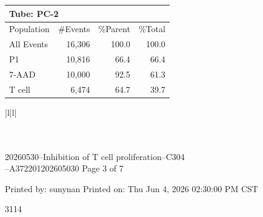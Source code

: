 \documentclass[UTF8,10pt,a4paper,fontset=fandol]{ctexart}
\newcommand{\handwritten}[1]{#1}
\begin{document}
\begin{center}
\begin{tabular}{|l|r|r|r|}
\hline
\multicolumn{4}{|l|}{Tube: PC-2}\\
\hline
Population & \#Events & \%Parent & \%Total\\
\hline
All Events & 16,306 & 100.0 & 100.0\\
P1 & 10,816 & 66.4 & 66.4\\
7-AAD & 10,000 & 92.5 & 61.3\\
T cell & 6,474 & 64.7 & 39.7\\
\hline
\end{tabular}
\end{center}

\vspace{8pt}

\begin{center}
\begin{tabular}{|l|l|}
\hline
{}\\
\\
\hline
{}\\
\hline
\end{tabular}
\end{center}

\vfill

\noindent
\small
20260530--Inhibition of T cell proliferation--C304\\
--A372201202605030
\hfill Page 3 of 7

\begin{center}
Printed by: sunynan \hspace{2cm} Printed on: Thu Jun 4, 2026 02:30:00 PM CST
\end{center}

\begin{flushright}
\handwritten{3114}
\end{flushright}
\end{document}
